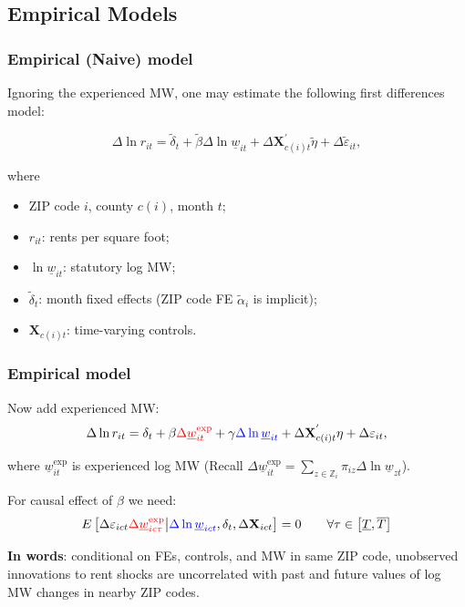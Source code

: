 \documentclass[aspectratio=169, t]{beamer}
\newcommand{\MW}{\underline{w}}
\begin{document}
\subsection{Empirical Models}

\begin{frame}[label = stat_only_model]
	\frametitle{Empirical (Naive) model}
	
	Ignoring the experienced MW, one may estimate the following first differences model:
	
	$$
	\Delta \ln r_{it} = \tilde\delta_t + 
	\tilde\beta \Delta \ln \MW_{it} + 
	\Delta \mathbf{X}^{'}_{c(i)t} \tilde\eta + 
	\Delta \tilde\varepsilon_{it} ,
	$$
	
	where	
	\begin{itemize} \small
	\item ZIP code $i$, county $c(i)$, month $t$;
	
	\item \vspace{1mm} $r_{it}$: rents per square foot;
	
	\item \vspace{1mm} $\ln \MW_{it}$: statutory log MW;
	
	\item \vspace{1mm} $\tilde\delta_t$: month fixed effects (ZIP code FE $\tilde\alpha_i 
	$ is 
	implicit);
	
	\item \vspace{.5mm} $\mathbf{X}_{c(i)t}$: time-varying controls.
	\end{itemize}
\end{frame}

\begin{frame}
	\frametitle{Empirical model}
		
	Now add experienced MW:
	$$
	\Delta \ln r_{it} = \delta_t +
	    \beta {\color{red}\Delta \MW^{\text{exp}}_{it}} +
		\gamma {\color{blue} \Delta \ln \MW_{it}} + 
		\Delta \mathbf{X}^{'}_{c(i)t} \eta + 
		\Delta \varepsilon_{it} ,
	$$
	
	where $\MW^{\text{exp}}_{it}$ is experienced log MW {\small (Recall 
	$\Delta \MW^{\text{exp}}_{it} = \sum_{z \in \mathbb{Z}_i} \pi_{i z} \Delta 
	\ln \MW_{zt}$)}.

	\pause
	\vspace{2mm}
	For causal effect of $\beta$ we need:
	$$
	E \left[\Delta \varepsilon_{ict} {\color{red} \Delta 
	\MW^{\text{exp}}_{ic\tau}} 
	\big| {\color{blue}\Delta \ln \MW_{ict}}, \delta_t, \Delta 
	\mathbf{X}_{ict} \right] = 0
	\quad \quad \forall \tau \in \left[ \underline{T}, \overline{T} \right]
	$$
	
	\pause
	\vspace{2mm}
	\textbf{In words}: conditional on FEs, controls, and {\color{blue} MW in same ZIP 
	code}, unobserved innovations to rent shocks are uncorrelated with past and future 
	values of log MW changes {\color{red} in nearby ZIP codes}.
\end{frame}
\end{document}
